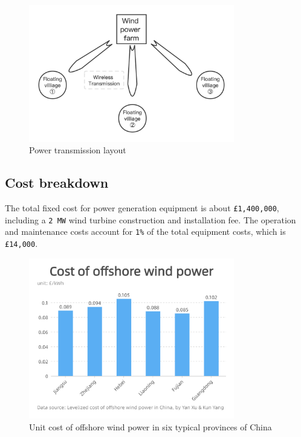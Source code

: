 \documentclass[11pt]{article}
\numberwithin{equation}{section}
\begin{document}
\begin{figure}[H]
\centering
\includegraphics[width=0.8\textwidth]{Figures/powerTransmission.png}
\caption{\label{powerTransmission}Power transmission layout}
\end{figure}

\subsection{Cost breakdown}
\label{sec:org025f7d4}
The total fixed cost for power generation equipment is about \texttt{£1,400,000}, including a \texttt{2 MW} wind turbine construction and installation fee. The operation and maintenance costs account for \texttt{1\%} of the total equipment costs, which is \texttt{£14,000}.

\begin{figure}[H]
\centering
\includegraphics[width=0.8\textwidth]{Figures/powerGenerationCost.png}
\caption{\label{powerGenerationCost}Unit cost of offshore wind power in six typical provinces of China}
\end{figure}
\end{document}

